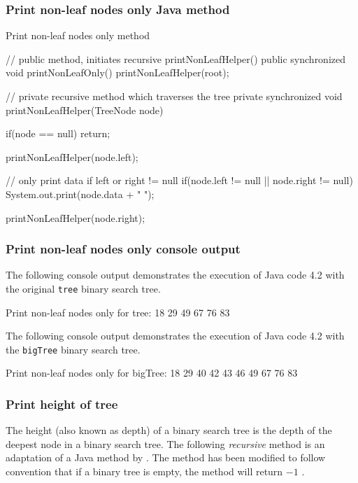 \subsubsection{Print non-leaf nodes only Java method}

\begin{listing}[H]
\caption{Print non-leaf nodes only method}
\begin{javacode}
// public method, initiates recursive printNonLeafHelper()
public synchronized void printNonLeafOnly() {
    printNonLeafHelper(root);
}

// private recursive method which traverses the tree
private synchronized void printNonLeafHelper(TreeNode node) {
    if(node == null) {
        return;
    }

    printNonLeafHelper(node.left);

    // only print data if left or right != null
    if(node.left != null || node.right != null) {
        System.out.print(node.data + " ");
    }

    printNonLeafHelper(node.right);
}
\end{javacode}
\end{listing}

\subsubsection{Print non-leaf nodes only console output}

The following console output demonstrates the execution of Java code 4.2 with the original \texttt{tree} binary search tree.
\\
\begin{consolecode}
Print non-leaf nodes only for tree:
18 29 49 67 76 83 
\end{consolecode}

\noindent
The following console output demonstrates the execution of Java code 4.2 with the \texttt{bigTree} binary search tree.
\\
\begin{consolecode}
Print non-leaf nodes only for bigTree:
18 29 40 42 43 46 49 67 76 83 
\end{consolecode}

\newpage
\subsubsection{Print height of tree}

The height (also known as depth) of a binary search tree is the depth of the deepest node in a binary search tree. The following \emph{recursive} method is an adaptation of a Java method by \citet{Flaschen2014}. The method has been modified to follow convention that if a binary tree is empty, the method will return $-1$ \citep[p. 239]{Watt2001}.

